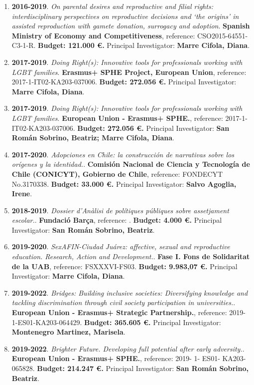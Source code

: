 \begin{enumerate}
\item {\bf 2016-2019}. {\it On parental desires and reproductive and filial rights: interdisciplinary perspectives on reproductive decisions and ‘the origins’ in assisted reproduction with gamete donation, surrogacy and adoption}. {\bf Spanish Ministry of Economy and Competitiveness},  reference: CSO2015-64551-C3-1-R. {\bf  Budget: 121.000 €.} Principal Investigator: {\bf Marre Cifola, Diana}.\filbreak
\item {\bf 2017-2019}. {\it Doing Right(s): Innovative tools for professionals working with LGBT families}. {\bf Erasmus+ SPHE Project, European Union},  reference: 2017-1-IT02-KA203-037006. {\bf  Budget: 272.056 €.} Principal Investigator: {\bf Marre Cifola, Diana}.\filbreak
\item {\bf 2017-2019}. {\it Doing Right(s): Innovative tools for professionals working with LGBT families}. {\bf European Union - Erasmus+ SPHE.},  reference: 2017-1-IT02-KA203-037006. {\bf  Budget: 272.056 €.} Principal Investigator: {\bf San Román Sobrino, Beatriz; Marre Cifola, Diana}.\filbreak
\item {\bf 2017-2020}. {\it Adopciones en Chile: la construcción de narrativas sobre los orígenes y la identidad.}. {\bf Comisión Nacional de Ciencia y Tecnología de Chile (CONICYT), Gobierno de Chile},  reference: FONDECYT No.3170338. {\bf  Budget: 33.000 €.} Principal Investigator: {\bf Salvo Agoglia, Irene}.\filbreak
\item {\bf 2018-2019}. {\it Dossier d’Anàlisi de polítiques públiques sobre assetjament escolar.}. {\bf Fundació Barça},  reference: . {\bf  Budget: 4.000 €.} Principal Investigator: {\bf San Román Sobrino, Beatriz}.\filbreak
\item {\bf 2019-2020}. {\it SexAFIN-Ciudad Juárez: affective, sexual and reproductive education. Research, Action and Development.}. {\bf Fase I. Fons de Solidaritat de la UAB},  reference: FSXXXVI-FS03. {\bf  Budget: 9.983,07 €.} Principal Investigator: {\bf Marre Cifola, Diana}.\filbreak
\item {\bf 2019-2022}. {\it Bridges: Building inclusive societies: Diversifying knowledge and tackling discrimination through civil society participation in universities.}. {\bf European Union - Erasmus+ Strategic Partnership.},  reference: 2019-1-ES01-KA203-064429. {\bf  Budget: 365.605 €.} Principal Investigator: {\bf Montenegro Martinez, Marisela}.\filbreak
\item {\bf 2019-2022}. {\it Brighter Future. Developing full potential after early adversity.}. {\bf European Union - Erasmus+ SPHE.},  reference: 2019- 1- ES01- KA203-065828. {\bf  Budget: 214.247 €.} Principal Investigator: {\bf San Román Sobrino, Beatriz}.\filbreak

\end{enumerate}
